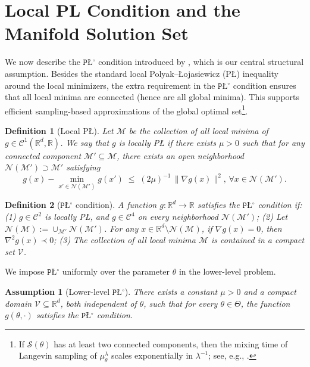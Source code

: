 \documentclass{article}
\theoremstyle{normaltheorem}
\newtheorem{definition}[definition]{Definition}
\newtheorem{assumption}{Assumption}
\newcommand{\gibbs}{\mu}
\newcommand{\gibbstheta}{\gibbs_\theta^\lambda}
\newcommand{\PLcirc}{\texttt{P\L$^\circ$}}
\newcommand{\R}{\mathbb{R}}
\newcommand{\calS}{\mathcal{S}}
\begin{document}
\section{Local PL Condition and the Manifold Solution Set}\label{sec:prelim}
We now describe the \(\PLcirc\) condition introduced by \citet{gong2024poincare}, which is our central structural assumption.
Besides the standard {local} Polyak--{\L}ojasiewicz (P\L) inequality around the local minimizers, the extra requirement in the \(\PLcirc\) condition ensures that all local minima are connected (hence are all global minima). 
This supports efficient sampling-based approximations of the global optimal set\footnote{{If $\calS(\theta)$ has at least two connected components, then the mixing time of Langevin sampling of $\gibbstheta$ scales exponentially in $\lambda^{-1}$; see, e.g., \citet{menz2014poincare}.}}.

\begin{definition}[Local P\L]\label{def_local_PL}
Let \(\mathcal{M}\) be the collection of all local minima of \(g\in\mathcal{C}^{1}(\R^{d},\R)\).
We say that \(g\) is \emph{locally P\L} if there exists \(\mu>0\) such that for any connected component
\(\mathcal{M}'\subseteq \mathcal{M}\), there exists an open neighborhood \(\mathcal{N}(\mathcal{M}')\supset \mathcal{M}'\) satisfying
\[
g(x) - \min_{x' \in \mathcal{N}(\mathcal{M}')} g(x')
\;\leq\;
(2\mu)^{-1}\,\|\nabla g(x)\|^{2},
\, \forall x \in \mathcal{N}(\mathcal{M}').
\]
\end{definition}

\begin{definition}[\(\PLcirc\) condition]\label{def_mu_PL_assum}
A function \(g:\R^d\to\R\) satisfies the \(\PLcirc\) condition if: (1) \(g\in\mathcal{C}^{2}\) is locally P\L, and \(g\in\mathcal{C}^{4}\) on every neighborhood \(\mathcal{N}(\mathcal{M}')\); (2) Let \(\mathcal{N}(\mathcal{M}) := \cup_{\mathcal{M}'}\mathcal{N}(\mathcal{M}')\). For any \(x\in \R^{d}\setminus \mathcal{N}(\mathcal{M})\), if \(\nabla g(x)=0\), then \(\nabla^{2}g(x)\prec 0\); (3) The collection of all local minima \(\mathcal{M}\) is contained in a compact set $\mathcal{V}$.
\end{definition}

We impose \(\PLcirc\) uniformly over the parameter \(\theta\) in the lower-level problem.
\begin{tcolorbox}[colback=gray!20, colframe=gray!50, boxrule=0pt, arc=0mm, left=0mm, right=0mm, top=0mm, bottom=0mm]
\begin{assumption}[Lower-level \(\PLcirc\)]\label{ass:plcirc}
There exists a constant \(\mu>0\) and a compact domain $\mathcal{V} \subseteq \mathbb{R}^d$, both independent of $\theta$, such that for every \(\theta\in\Theta\), the function \(g(\theta,\cdot)\) satisfies the \(\PLcirc\) condition.
\end{assumption}
\end{tcolorbox}
\end{document}
